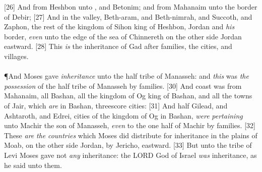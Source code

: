 [26] \textcolor[cmyk]{0.99998,1,0,0}{And from Heshbon unto , and Betonim; and from Mahanaim unto the border of Debir;}
[27] \textcolor[cmyk]{0.99998,1,0,0}{And in the valley, Beth-aram, and Beth-nimrah, and Succoth, and Zaphon, the rest of the kingdom of Sihon king of Heshbon, Jordan and \emph{his} border, \emph{even} unto the edge of the sea of Chinnereth on the other side Jordan eastward.}
[28] \textcolor[cmyk]{0.99998,1,0,0}{This \emph{is} the inheritance of   Gad after   families, the cities, and   villages.}\\
\\
\P \textcolor[cmyk]{0.99998,1,0,0}{And Moses gave \emph{inheritance} unto the half tribe of Manasseh: and \emph{this} was \emph{the} \emph{possession} of the half tribe of   Manasseh by   families.}
[30] \textcolor[cmyk]{0.99998,1,0,0}{And   coast was from Mahanaim, all Bashan, all the kingdom of Og king of Bashan, and all the towns of Jair, which \emph{are} in Bashan, threescore cities:}
[31] \textcolor[cmyk]{0.99998,1,0,0}{And half Gilead, and Ashtaroth, and Edrei, cities of the kingdom of Og in Bashan, \emph{were} \emph{pertaining} unto   Machir the son of Manasseh, \emph{even} to the one half of   Machir by   families.}
[32] \textcolor[cmyk]{0.99998,1,0,0}{These \emph{are} \emph{the} \emph{countries} which Moses did distribute for inheritance in the plains of Moab, on the other side Jordan, by Jericho, eastward.}
[33] \textcolor[cmyk]{0.99998,1,0,0}{But unto the tribe of Levi Moses gave not \emph{any} inheritance: the LORD God of Israel \emph{was}   inheritance, as he said unto them.}
